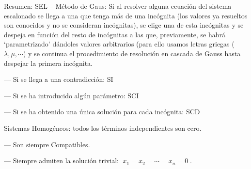 \begin{myalertblock}{Resumen: SEL -- Método de Gaus:}
Si al resolver alguna ecuación del sistema escalonado se llega a una que tenga más de una incógnita (los valores ya resueltos son conocidos y no se consideran incógnitas), se elige una de esta incógnitas y se despeja en función del resto de incógnitas a las que, previamente, se habrá `parametrizado' dándoles valores arbitrarios (para ello usamos letras griegas ($\lambda, \mu, \cdots$) y se continua el procedimiento de resolución en cascada de Gauss hasta despejar la primera incógnita.

--- Si se llega a una contradicción: SI

--- Si se ha introducido algún parámetro: SCI

--- Si se ha obtenido una única solución para cada incógnita: SCD

\vspace{2mm} Sistemas Homogéneos: todos los términos independientes son cero.

--- Son siempre Compatibles.

--- Siempre admiten la solución trivial: $ \; x_1 = x_2 = \cdots = x_n = 0 \;$.	
\end{myalertblock}























		
%
%




